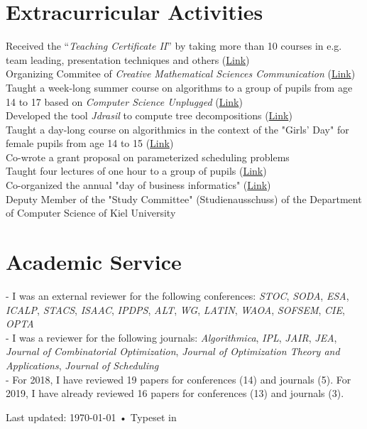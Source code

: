 \documentclass[10pt, a4paper]{article}
\newcommand{\years}[1]{\marginnote{\scriptsize #1}}
\begin{document}
\newpage
\section*{Extracurricular Activities}
\years{2012--2015}Received the ``\emph{Teaching Certificate II}'' by taking
more than 10 courses in e.g. team leading, presentation techniques and
others (\href{https://www.uni-luebeck.de/universitaet/einrichtungen/dozierenden-service-center/hochschuldidaktik/zertifikatsprogramm.html}{Link})\\
\years{2016}Organizing Commitee of \emph{Creative Mathematical Sciences
  Communication} (\href{http://www.tcs.uni-luebeck.de/cmsc/}{Link})\\
\years{2016}Taught a week-long summer course on algorithms to a group of
pupils from age 14 to 17 based on \emph{Computer Science Unplugged}
(\href{https://www.lias.uni-luebeck.de/veranstaltungen/isc/isc16.html}{Link})\\
\years{2016}Developed the tool \emph{Jdrasil} to compute tree
decompositions (\href{https://github.com/maxbannach/Jdrasil}{Link})\\
\years{2018}Taught a day-long course on algorithmics in the context of the
"Girls' Day" for female pupils from age 14 to 15
(\href{https://www.inf.uni-kiel.de/de/aktuelles/girls-day-am-insitut-fuer-informatik}{Link})\\
\years{2017}Co-wrote a grant proposal on parameterized scheduling problems\\
\years{2018}Taught four lectures of one hour to a group of pupils
(\href{https://www.inf.uni-kiel.de/de/informatik-schule/schnupperstudium/bilder-schnupperstudium/programm-2018}{Link})\\
\years{2018}Co-organized the annual "day of business informatics"
(\href{http://www.kn-online.de/Kiel/Tag-der-Wirtschaftsinformatik-Ein-extrem-wichtiges-Studium-in-Kiel}{Link})\\
\years{2019}Deputy Member of the "Study Committee" (Studienausschuss) of the
Department of Computer Science of Kiel University

\section*{Academic Service}
- I was an external reviewer for the following conferences: \emph{STOC},
\emph{SODA}, \emph{ESA}, \emph{ICALP}, \emph{STACS}, \emph{ISAAC}, \emph{IPDPS}, \emph{ALT}, \emph{WG},
\emph{LATIN}, \emph{WAOA}, 
 \emph{SOFSEM}, \emph{CIE}, \emph{OPTA}\\
- I was a reviewer for the following journals: \emph{Algorithmica}, \emph{IPL}, \emph{JAIR},
\emph{JEA}, \emph{Journal of Combinatorial Optimization}, \emph{Journal of Optimization Theory and Applications},
\emph{Journal of Scheduling}\\
- For 2018, I have reviewed 19 papers for conferences (14) and journals (5).
For 2019, I have already reviewed 16 papers for conferences (13) and journals (3).






\vspace{-.05cm}
\vfill{}
\begin{center}

{\scriptsize  Last updated: \today\- •\- Typeset in \href{http://nitens.org/taraborelli/cvtex}{
  \XeLaTeX}\\
}
\end{center}
\end{document}
